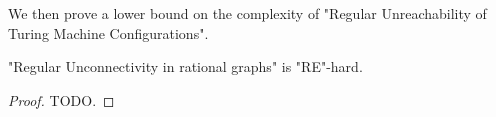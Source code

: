 We then prove a lower bound on the complexity of "Regular Unreachability of Turing Machine Configurations".

\begin{lemma}
	\AP\label{lemma:regular-unconnectivity-lowerbound}
	"Regular Unconnectivity in rational graphs" is "RE"-hard.
\end{lemma}

\begin{proof}
	TODO.


\end{proof}
